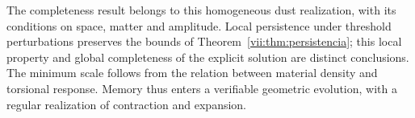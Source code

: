 The completeness result belongs to this homogeneous dust realization,
with its conditions on space, matter and amplitude. Local persistence
under threshold perturbations preserves the bounds of
Theorem~\ref{vii:thm:persistencia}; this local property and global
completeness of the explicit solution are distinct conclusions.
The minimum scale follows from the relation between material density
and torsional response. Memory thus enters a verifiable geometric
evolution, with a regular realization of contraction and expansion.
